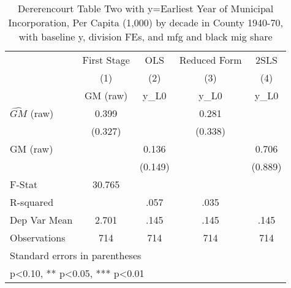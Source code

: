 \begin{table}[htbp]\centering
\def\sym#1{\ifmmode^{#1}\else\(^{#1}\)\fi}
\caption{Dererencourt Table Two with y=Earliest Year of Municipal Incorporation, Per Capita (1,000) by decade in County 1940-70, with baseline y, division FEs, and mfg and black mig share}
\begin{tabular}{l*{4}{c}}
\toprule
                    & First Stage   &         OLS   &Reduced Form   &        2SLS   \\
                    &\multicolumn{1}{c}{(1)}&\multicolumn{1}{c}{(2)}&\multicolumn{1}{c}{(3)}&\multicolumn{1}{c}{(4)}\\
                    &\multicolumn{1}{c}{GM  (raw)}&\multicolumn{1}{c}{y\_L0}&\multicolumn{1}{c}{y\_L0}&\multicolumn{1}{c}{y\_L0}\\
\midrule
$\hat{GM}$ (raw)    &       0.399   &               &       0.281   &               \\
                    &     (0.327)   &               &     (0.338)   &               \\
\addlinespace
GM  (raw)           &               &       0.136   &               &       0.706   \\
                    &               &     (0.149)   &               &     (0.889)   \\
\midrule
F-Stat              &      30.765   &               &               &               \\
R-squared           &               &        .057   &        .035   &               \\
Dep Var Mean        &       2.701   &        .145   &        .145   &        .145   \\
Observations        &         714   &         714   &         714   &         714   \\
\bottomrule
\multicolumn{5}{l}{\footnotesize Standard errors in parentheses}\\
\multicolumn{5}{l}{\footnotesize * p<0.10, ** p<0.05, *** p<0.01}\\
\end{tabular}
\end{table}
